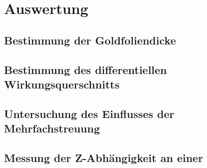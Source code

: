 \section{Auswertung}
\subsection{Bestimmung der Goldfoliendicke}
\subsection{Bestimmung des differentiellen Wirkungsquerschnitts}
\subsection{Untersuchung des Einflusses der Mehrfachstreuung}
\subsection{Messung der Z-Abhängigkeit an einer }
